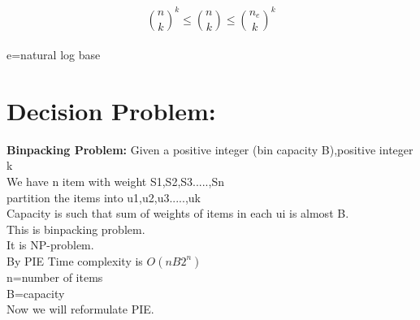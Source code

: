 $$ {n \choose k}^{k} \leq {n \choose k} \leq {n_e \choose k}^{k} $$\\
e=natural log base \\
\section{Decision Problem:}
\textbf{Binpacking Problem:}
Given a positive integer (bin capacity B),positive integer k\\
We have n item with weight S1,S2,S3.....,Sn\\
partition the items into u1,u2,u3.....,uk\\
Capacity is such that sum of weights of items in each ui is almost B.\\
This is binpacking problem.\\
It is NP-problem.\\
By PIE Time complexity is $O(nB2^{n})$\\
n=number of items\\
B=capacity\\
Now we will reformulate PIE.\\

